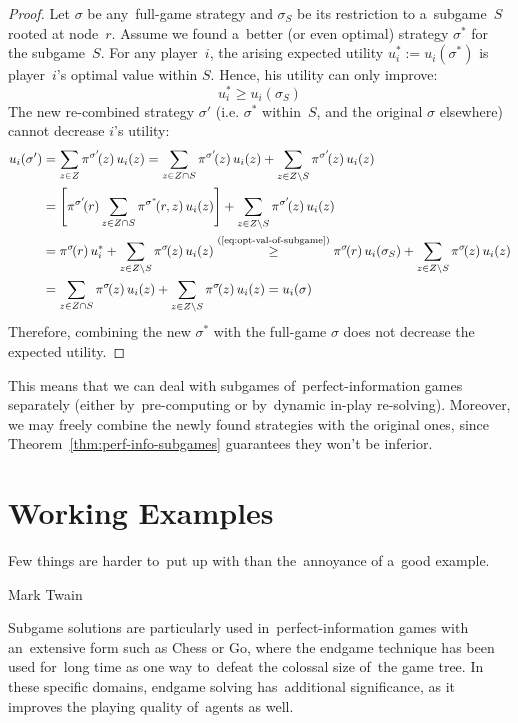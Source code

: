 \begin{proof}
  Let $\sigma$ be any~full-game strategy and $\sigma_S$ be its restriction to a~subgame~$S$ rooted at node~$r$.
  Assume we found a~better (or even optimal) strategy $\sigma^*$ for the subgame~$S$.
  For any player~$i$, the arising expected utility $u^*_i := u_i(\sigma^*)$ is player~$i$'s optimal value within $S$.
  Hence, his utility can only improve:
  \begin{equation}
    u^*_i \ge u_i(\sigma_S)
    \label{eq:opt-val-of-subgame}
  \end{equation}
  The new re-combined strategy $\sigma'$ (i.e. $\sigma^*$ within~$S$, and the original $\sigma$ elsewhere) cannot decrease $i$'s utility:
  \begin{align*}
    u_i(\sigma')
    &= \sum _{z \in Z} \pi^{\sigma'}\!(z) \,u_i(z)
    = \sum _{z \in Z \cap S} \pi^{\sigma'}\!(z) \,u_i(z)
    + \sum _{z \in Z \setminus S} \pi^{\sigma'}\!(z) \,u_i(z) \\
    &= \left[ \pi^{\sigma'}\!(r)\sum _{z \in Z \cap S} \pi^{\sigma^*}\!(r, z) \,u_i(z) \right]
    + \sum _{z \in Z \setminus S} \pi^{\sigma'}\!(z) \,u_i(z) \\
    &= \pi^{\sigma}\!(r) \,u_i^*
    + \sum _{z \in Z \setminus S} \pi^{\sigma}\!(z) \,u_i(z)
    \stackrel{\text{(\ref{eq:opt-val-of-subgame})}}{\ge} \pi^{\sigma}\!(r) \,u_i(\sigma_S)
    + \sum _{z \in Z \setminus S} \pi^{\sigma}\!(z) \,u_i(z) \\
    &= \sum _{z \in Z \cap S} \pi^{\sigma}\!(z) \,u_i(z)
    + \sum _{z \in Z \setminus S} \pi^{\sigma}\!(z) \,u_i(z)
    = u_i(\sigma)
  \end{align*}
  Therefore, combining the new $\sigma^*$ with the full-game $\sigma$ does not decrease the expected utility.
\end{proof}

This means that we can deal with subgames of~perfect-information games separately (either by~pre-computing or by~dynamic in-play re-solving).
Moreover, we may freely combine the newly found strategies with the original ones, since Theorem~\ref{thm:perf-info-subgames} guarantees they won't be inferior.

\section{Working Examples}
\epigraph{
  Few things are harder to~put up with than the~annoyance of a~good example.
}{Mark Twain}
Subgame solutions are particularly used in~perfect-information games with an~extensive form such as Chess or Go, where the endgame technique has been used for~long time as one way to~defeat the colossal size of~the game tree.
In these specific domains, endgame solving has~additional significance, as it improves the playing quality of~agents as well.

